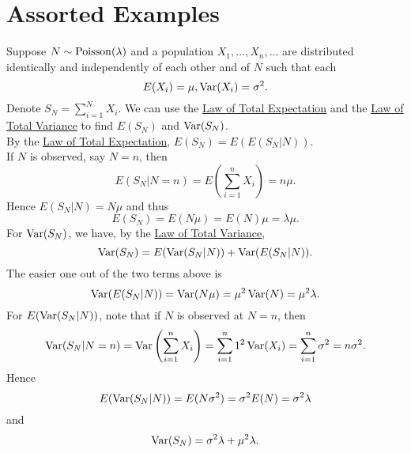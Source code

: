\documentclass[11pt,fleqn]{book} %
\begin{document}

\section{Assorted Examples}

\begin{example} \label{eg:821}
Suppose \(N \sim \operatorname{Poisson}(\lambda)\) and a population \(X_1, \ldots, X_n, \ldots\) are distributed identically and independently of each other and of \(N\) such that each
\[
E(X_i) = \mu, \operatorname{Var}(X_i) = \sigma^2.
\]
\indent Denote \(S_N = \sum_{i=1}^N X_i\). We can use the \hyperref[thm:276]{Law of Total Expectation} and the \hyperref[thm:278]{Law of Total Variance} to find \(E(S_N)\) and \(\operatorname{Var}(S_N)\). \\
\indent By the \hyperref[thm:276]{Law of Total Expectation}, \(E(S_N) = E(E(S_N | N))\). \\
\indent If \(N\) is observed, say \(N = n\), then
\[
E(S_N | N = n) = E\left(\sum_{i=1}^n X_i\right) = n\mu.
\]
\indent Hence \(E(S_N|N) = N\mu\) and thus
\[
E(S_N) = E(N\mu) = E(N)\mu = \lambda \mu.
\]
\indent For \(\operatorname{Var}(S_N)\), we have, by the \hyperref[thm:278]{Law of Total Variance}, 
\[
\operatorname{Var}(S_N) = E(\operatorname{Var}(S_N|N)) + \operatorname{Var}(E(S_N|N)).
\]
\indent The easier one out of the two terms above is
\[
\operatorname{Var}(E(S_N|N)) = \operatorname{Var}(N\mu) = \mu^2\operatorname{Var}(N) = \mu^2\lambda.
\]
\indent For \(E(\operatorname{Var}(S_N|N))\), note that if \(N\) is observed at \(N = n\), then
\[
\operatorname{Var}(S_N|N = n) = \operatorname{Var}\left(\sum_{i=1}^n X_i\right) = \sum_{i=1}^n 1^2\operatorname{Var}(X_i) = \sum_{i=1}^n \sigma^2 = n\sigma^2.
\]
\indent Hence
\[
E(\operatorname{Var}(S_N|N)) = E(N\sigma^2) = \sigma^2 E(N) = \sigma^2\lambda
\]
and
\[
\operatorname{Var}(S_N) = \sigma^2\lambda + \mu^2\lambda.
\]
\end{example}
\end{document}
